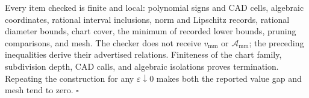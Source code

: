 Every item checked is finite and local: polynomial signs and CAD cells, algebraic coordinates, rational interval inclusions, norm and Lipschitz records, rational diameter bounds, chart cover, the minimum of recorded lower bounds, pruning comparisons, and mesh.  The checker does not receive \(v_{\mathrm{mm}}\) or \(\mathcal A_{\mathrm{mm}}\); the preceding inequalities derive their advertised relations.  Finiteness of the chart family, subdivision depth, CAD calls, and algebraic isolations proves termination.  Repeating the construction for any \(\varepsilon\downarrow0\) makes both the reported value gap and mesh tend to zero. \(\square\)